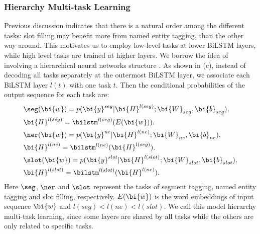 \subsubsection{Hierarchy Multi-task Learning}
Previous discussion indicates that 
there is a natural order among the different tasks:
slot filling may benefit more from named entity tagging, than the other way around.
This motivates us to employ low-level tasks at lower BiLSTM layers,
while high level tasks are trained at higher layers.
We borrow the idea of involving a hierarchical neural networks structure \cite{peters2018deep,sogaard2016deep}.
As shown in (c), 
instead of decoding all tasks separately at the outermost BiLSTM layer, 
we associate each BiLSTM layer
$l(t)$ with one task $t$.
Then the conditional probabilities of the output sequence for each task are:
\begin{eqnarray*}
	& \seg(\bi{w})=p(\bi{y}^{seg}|\bi{H}^{l(seg)};\bi{W}_{seg},\bi{b}_{seg}), \\
	& \bi{H}^{l(seg)}=\bilstm^{l(seg)}(E(\bi{w})). \\
	& \ner(\bi{w})=p(\bi{y}^{ne}|\bi{H}^{l(ne)};\bi{W}_{ne},\bi{b}_{ne}), \\
	& \bi{H}^{l(ne)}=\bilstm^{l(ne)}(\bi{H}^{l(seg)}).\\
	& \slot(\bi{w})=p(\bi{y}^{slot}|\bi{H}^{l(slot)};\bi{W}_{slot},\bi{b}_{slot}), \\
	& \bi{H}^{l(slot)}=\bilstm^{l(slot)}(\bi{H}^{l(ne)}).
\end{eqnarray*}
Here $\seg$, $\ner$ and $\slot$ represent the tasks of
segment tagging, named entity tagging and slot filling, respectively.
$E(\bi{w})$ is the word embeddings of input sequence $\bi{w}$ and 
$l(seg) < l(ne) < l(slot)$.
We call this model hierarchy multi-task learning,
since some layers are shared by all tasks 
while the others are only related to specific tasks.

